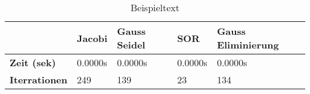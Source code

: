 \begin{table}[h!]
\centering
\caption{Beispieltext}
\label{example}
\begin{tabular}{lllll}
\toprule
{} &   Jacobi & Gauss Seidel &      SOR & Gauss Eliminierung \\
\midrule
\textbf{Zeit (sek)  } &  0.0000s &      0.0000s &  0.0000s &            0.0000s \\
\textbf{Iterrationen} &      249 &          139 &       23 &                134 \\
\bottomrule
\end{tabular}
\end{table}
